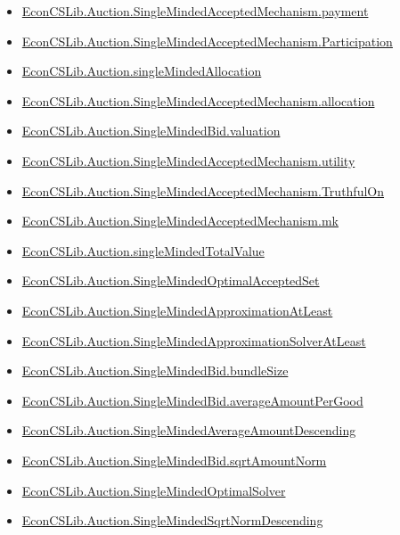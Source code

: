\documentclass[10pt]{article}
\begin{document}
\begin{itemize}[leftmargin=1.2em]
\begin{itemize}[leftmargin=1.2em]
\item \hyperlink{library-prerequisite-7543dfa71c112a9d}{EconCSLib.Auction.SingleMindedAcceptedMechanism.payment}
\item \hyperlink{library-prerequisite-58dbef1804dcf42f}{EconCSLib.Auction.SingleMindedAcceptedMechanism.Participation}
\item \hyperlink{library-prerequisite-18b757fff53c997a}{EconCSLib.Auction.singleMindedAllocation}
\item \hyperlink{library-prerequisite-72ca40a09017d714}{EconCSLib.Auction.SingleMindedAcceptedMechanism.allocation}
\item \hyperlink{library-prerequisite-5c19a61a90fd40e3}{EconCSLib.Auction.SingleMindedBid.valuation}
\item \hyperlink{library-prerequisite-3bfee09c8d391635}{EconCSLib.Auction.SingleMindedAcceptedMechanism.utility}
\item \hyperlink{library-prerequisite-3c118ac7f41da0b0}{EconCSLib.Auction.SingleMindedAcceptedMechanism.TruthfulOn}
\item \hyperlink{library-prerequisite-3a203362164e69f3}{EconCSLib.Auction.SingleMindedAcceptedMechanism.mk}
\item \hyperlink{library-prerequisite-f06d6b3ca6a81ee4}{EconCSLib.Auction.singleMindedTotalValue}
\item \hyperlink{library-prerequisite-5570f5916a975d3a}{EconCSLib.Auction.SingleMindedOptimalAcceptedSet}
\item \hyperlink{library-prerequisite-08a710550e52c408}{EconCSLib.Auction.SingleMindedApproximationAtLeast}
\item \hyperlink{library-prerequisite-664c9970e3dcb3be}{EconCSLib.Auction.SingleMindedApproximationSolverAtLeast}
\item \hyperlink{library-prerequisite-304dea9d12bb4696}{EconCSLib.Auction.SingleMindedBid.bundleSize}
\item \hyperlink{library-prerequisite-7ef217e5c5453a0f}{EconCSLib.Auction.SingleMindedBid.averageAmountPerGood}
\item \hyperlink{library-prerequisite-a08c651896a919f2}{EconCSLib.Auction.SingleMindedAverageAmountDescending}
\item \hyperlink{library-prerequisite-ecb802cad361046b}{EconCSLib.Auction.SingleMindedBid.sqrtAmountNorm}
\item \hyperlink{library-prerequisite-953e12fb81c8af52}{EconCSLib.Auction.SingleMindedOptimalSolver}
\item \hyperlink{library-prerequisite-252f3376ef5e48a6}{EconCSLib.Auction.SingleMindedSqrtNormDescending}

\end{itemize}
\end{itemize}
\end{document}
